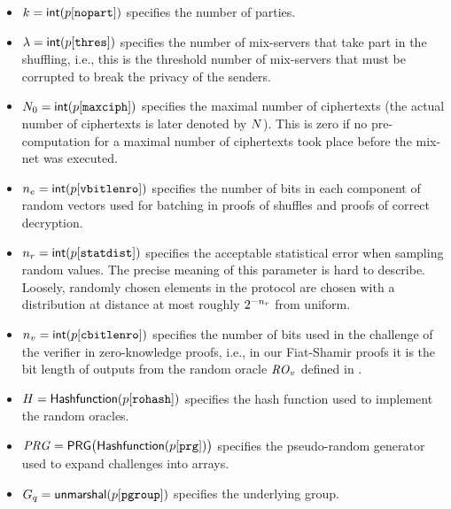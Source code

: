 \documentclass[11pt]{article}
\begin{document}
\begin{itemize}


\item $k=\textsf{int}(p[\texttt{nopart}])$ specifies the number of parties.

\item $\lambda=\textsf{int}(p[\texttt{thres}])$ specifies the number of
  mix-servers that take part in the shuffling, i.e., this is the
  threshold number of mix-servers that must be corrupted to break the
  privacy of the senders.

\item $N_{0}=\textsf{int}(p[\texttt{maxciph}])$ specifies the
  maximal number of ciphertexts (the actual number of ciphertexts is
  later denoted by $N$). This is zero if no pre-computation for a
  maximal number of ciphertexts took place before the mix-net was
  executed.

\item ${n_e}=\textsf{int}(p[\texttt{vbitlenro}])$ specifies the
  number of bits in each component of random vectors used for batching
  in proofs of shuffles and proofs of correct decryption.

\item $n_r=\textsf{int}(p[\texttt{statdist}])$ specifies the
  acceptable statistical error when sampling random values. The
  precise meaning of this parameter is hard to describe. Loosely,
  randomly chosen elements in the protocol are chosen with a
  distribution at distance at most roughly $2^{-n_r}$ from uniform.

\item $n_v=\textsf{int}(p[\texttt{cbitlenro}])$ specifies the
  number of bits used in the challenge of the verifier in
  zero-knowledge proofs, i.e., in our Fiat-Shamir proofs it is the bit
  length of outputs from the random oracle $\mathit{RO}_v$ defined in
  .



\item $H=\textsf{Hashfunction}(p[\texttt{rohash}])$ specifies the
  hash function used to implement the random oracles.

\item $\mathit{PRG}=\textsf{PRG}\big(\textsf{Hashfunction}(p[\texttt{prg}])\big)$ specifies the
  pseudo-random generator used to expand challenges into arrays.

\item $G_{q}=\textsf{unmarshal}(p[\texttt{pgroup}])$ specifies the
  underlying group.

\end{itemize}
\end{document}
